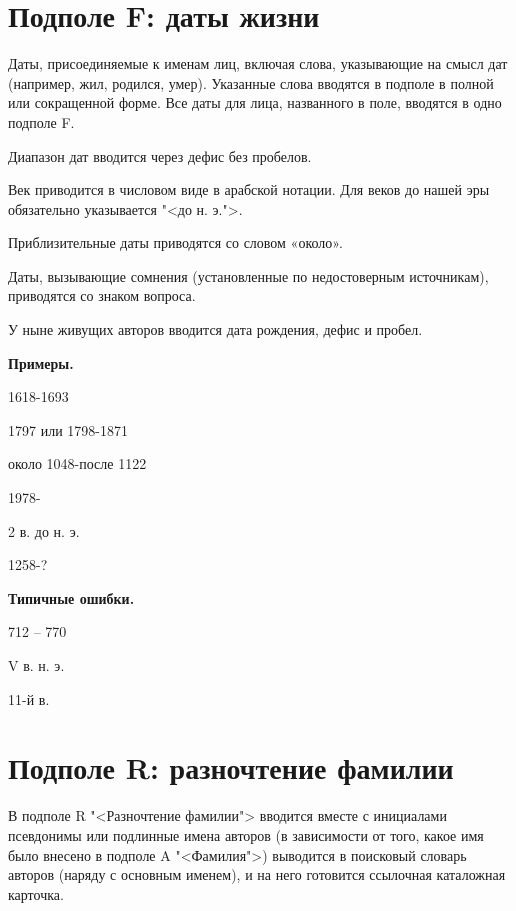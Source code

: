 \section{Подполе F: даты жизни}

Даты, присоединяемые к именам лиц, включая слова, указывающие на смысл дат (например, жил, родился, умер). Указанные слова вводятся в подполе в полной или сокращенной форме. Все даты для лица, названного в поле, вводятся в одно подполе F.

Диапазон дат вводится через дефис без пробелов.

Век приводится в числовом виде в арабской нотации. Для веков до нашей эры обязательно указывается "<до н. э.">.

Приблизительные даты приводятся со словом «около».

Даты, вызывающие сомнения (установленные по недостоверным источникам), приводятся со знаком вопроса.

У ныне живущих авторов вводится дата рождения, дефис и пробел.

\textbf{Примеры.}

\begin{cutelist}
    \item 1618-1693
    \item 1797 или 1798-1871
    \item около 1048-после 1122
    \item 1978-
    \item 2 в. до н. э.
    \item 1258-?
\end{cutelist}

\textbf{Типичные ошибки.}

\begin{cutelist}
    \item 712 -- 770
    \item V в. н. э.
    \item 11-й в.
\end{cutelist}

\section{Подполе R: разночтение фамилии}

В подполе R "<Разночтение фамилии"> вводится вместе с инициалами псевдонимы или подлинные имена авторов (в зависимости от того, какое имя было внесено в подполе A "<Фамилия">) выводится в поисковый словарь авторов (наряду с основным именем), и на него готовится ссылочная каталожная карточка.


